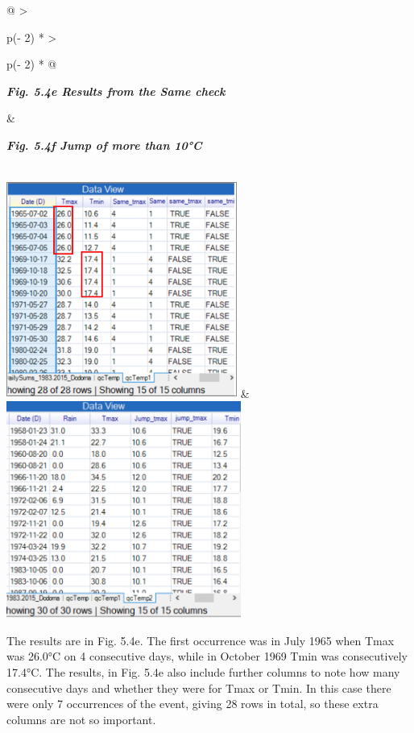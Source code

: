 \documentclass[
  letterpaper,
  DIV=11,
  numbers=noendperiod]{scrreprt}
\begin{document}
\begin{longtable}[]{@{}
  >{\raggedright\arraybackslash}p{(\columnwidth - 2\tabcolsep) * }
  >{\raggedright\arraybackslash}p{(\columnwidth - 2\tabcolsep) * }@{}}
\toprule\noalign{}
\begin{minipage}[b]{\linewidth}\raggedright
\textbf{\emph{Fig. 5.4e Results from the Same check}}
\end{minipage} & \begin{minipage}[b]{\linewidth}\raggedright
\textbf{\emph{Fig. 5.4f Jump of more than 10°C}}
\end{minipage} \\
\midrule\noalign{}
\endhead
\bottomrule\noalign{}
\endlastfoot
\includegraphics[width=2.97921in,height=2.80925in]{figures/Fig5.4e.png}
&
\includegraphics[width=3.02875in,height=2.79923in]{figures/Fig5.4f.png} \\
\end{longtable}

The results are in Fig. 5.4e. The first occurrence was in July 1965 when
Tmax was 26.0°C on 4 consecutive days, while in October 1969 Tmin was
consecutively 17.4°C. The results, in Fig. 5.4e also include further
columns to note how many consecutive days and whether they were for Tmax
or Tmin. In this case there were only 7 occurrences of the event, giving
28 rows in total, so these extra columns are not so important.
\end{document}
